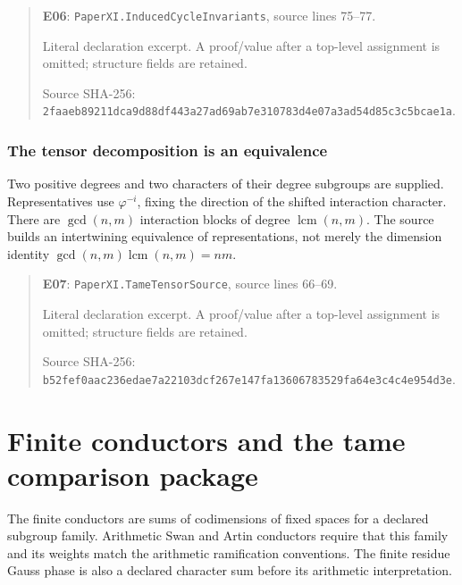 \documentclass[10pt,oneside]{book}
\begin{document}
\begin{quote}\footnotesize\textbf{E06}: \nolinkurl{PaperXI.InducedCycleInvariants}, source lines 75--77.\par Literal declaration excerpt. A proof/value after a top-level assignment is omitted; structure fields are retained.\par Source SHA-256: {\scriptsize\texttt{2faaeb89211dca9d88df443a27ad69ab7e310783d4e07a3ad54d85c3c5bcae1a}}.\end{quote}


\subsection{The tensor decomposition is an equivalence}
\label{guide:E07}
Two positive degrees and two characters of their degree subgroups are supplied. Representatives use \(\varphi^{-i}\), fixing the direction of the shifted interaction character.
There are \(\gcd(n,m)\) interaction blocks of degree \(\operatorname{lcm}(n,m)\). The source builds an intertwining equivalence of representations, not merely the dimension identity \(\gcd(n,m)\operatorname{lcm}(n,m)=nm\).

\begin{quote}\footnotesize\textbf{E07}: \nolinkurl{PaperXI.TameTensorSource}, source lines 66--69.\par Literal declaration excerpt. A proof/value after a top-level assignment is omitted; structure fields are retained.\par Source SHA-256: {\scriptsize\texttt{b52fef0aac236edae7a22103dcf267e147fa13606783529fa64e3c4c4e954d3e}}.\end{quote}


\chapter{Finite conductors and the tame comparison package}
The finite conductors are sums of codimensions of fixed spaces for a declared subgroup family. Arithmetic Swan and Artin conductors require that this family and its weights match the arithmetic ramification conventions. The finite residue Gauss phase is also a declared character sum before its arithmetic interpretation.
\end{document}
